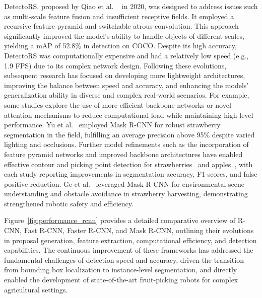 \documentclass[pdflatex,sn-mathphys-num]{sn-jnl}
\begin{document}
DetectoRS, proposed by Qiao et al. ~\cite{qiao2021detectors} in 2020, was designed to address issues such as multi-scale feature fusion and insufficient receptive fields. It employed a recursive feature pyramid and switchable atrous convolution. This approach significantly improved the model's ability to handle objects of different scales, yielding a mAP of 52.8\% in detection on COCO. Despite its high accuracy, DetectoRS was computationally expensive and had a relatively low speed (e.g., 1.9 FPS) due to its complex network design.
Following these evolutions, subsequent research has focused on developing more lightweight architectures, improving the balance between speed and accuracy, and enhancing the models' generalization ability in diverse and complex real-world scenarios. For example, some studies explore the use of more efficient backbone networks or novel attention mechanisms to reduce computational load while maintaining high-level performance.
Yu et al.~\cite{yu2019fruit} employed Mask R-CNN for robust strawberry segmentation in the field, fulfilling an average precision above 95\% despite varied lighting and occlusions. Further model refinements such as the incorporation of feature pyramid networks and improved backbone architectures have enabled effective contour and picking point detection for strawberries~\cite{jia2020detection} and apples~\cite{chu2021deep}, with each study reporting improvements in segmentation accuracy, F1-scores, and false positive reduction. Ge et al.~\cite{ge2019fruit} leveraged Mask R-CNN for environmental scene understanding and obstacle avoidance in strawberry harvesting, demonstrating strengthened robotic safety and efficiency.

Figure~\ref{fig:performance_rcnn} provides a detailed comparative overview of R-CNN, Fast R-CNN, Faster R-CNN, and Mask R-CNN, outlining their evolutions in proposal generation, feature extraction, computational efficiency, and detection capabilities. The continuous improvement of these frameworks has addressed the fundamental challenges of detection speed and accuracy, driven the transition from bounding box localization to instance-level segmentation, and directly enabled the development of state-of-the-art fruit-picking robots for complex agricultural settings.
\end{document}
